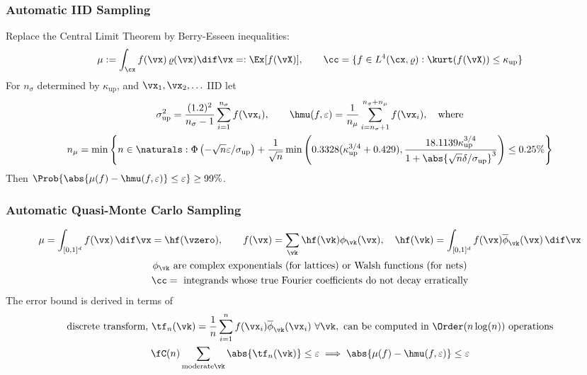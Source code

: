 \documentclass[10pt,compress,xcolor={usenames,dvipsnames},aspectratio=169]{beamer} %
\begin{document}
\begin{frame}
\frametitle{Automatic IID Sampling}
\vspace{-4ex}
Replace the Central Limit Theorem by Berry-Esseen inequalities:
\begin{equation*}
\mu :=  \int_{\cx} f(\vx) \, \varrho(\vx) \dif\vx =: \Ex[f(\vX)], \qquad \cc = \{f \in L^4(\cx,\varrho) : \kurt(f(\vX)) \le \kappa_{\text{up}} \}
\end{equation*}
For $n_\sigma$ determined by $\kappa_{\text{up}}$, and $\vx_1, \vx_2, \ldots $ IID let 
\begin{gather*}
\sigma_{\text{up}}^2 = \frac{(1.2)^2}{n_\sigma-1} \sum_{i=1}^{n_\sigma}f(\vx_i), \qquad \hmu(f,\varepsilon) = \frac 1{n_\mu} \sum_{i=n_\sigma+1}^{n_\sigma + n_{\mu}} f(\vx_i), \quad\text{where}\\
n_\mu = \min \left\{n \in \naturals: 
\Phi\left(-\sqrt{n}\varepsilon/\sigma_{\text{up}} 
\right)+\frac{1}{\sqrt{n}} \min\left(0.3328(\kappa_{\text{up}}^{3/4}+0.429), \frac{18.1139 
	\kappa_{\text{up}}^{3/4}}{1+\abs{\sqrt{n}\delta/\sigma_{\text{up}}}^{3}} 
\right) \le 0.25\% \right\}
\end{gather*}
Then $\Prob\{\abs{\mu(f) - \hmu(f,\varepsilon)} \le \varepsilon\} \ge 99\%$.
\end{frame}

\begin{frame}[fragile]
\frametitle{Automatic Quasi-Monte Carlo Sampling}
\vspace{-7ex}
\begin{gather*}
\mu = \int_{[0,1]^d} f(\vx) \, \dif \vx = \hf(\vzero), \qquad f(\vx) = \sum_{\vk} \hf(\vk) \phi_\vk(\vx), \quad \hf(\vk) = \int_{[0,1]^d} f(\vx) \overline{\phi}_{\vk}(\vx)\, \dif \vx\\  \phi_\vk \text{ are complex exponentials (for lattices) or Walsh functions (for nets)} \\
\cc = \text{ integrands whose true Fourier coefficients do not decay erratically}
\end{gather*}
The error bound is derived in terms of 
	\begin{gather*}
	\text{discrete transform, } \tf_n(\vk) = \frac 1n \sum_{i=1}^n f(\vx_i) \overline{\phi}_\vk(\vx_i) \ \forall \vk, \text{ can be computed in } \Order(n \log(n)) \text{ operations} \\
	\fC(n) \sum_{\text{moderate} \vk} \abs{\tf_n(\vk)} \le \varepsilon \implies \abs{\mu(f) - \hmu(f,\varepsilon)} \le \varepsilon
	\end{gather*}
\end{frame}
\end{document}
